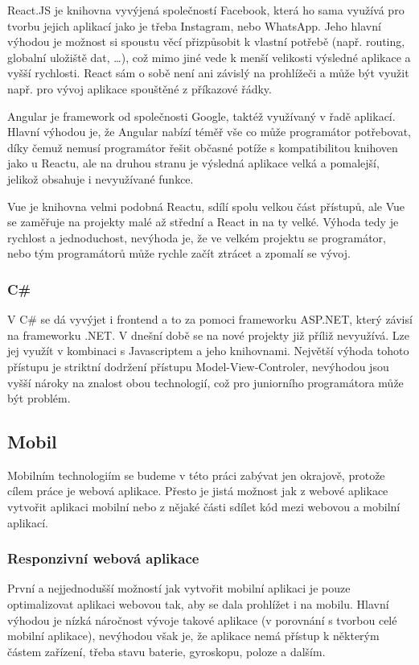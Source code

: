 React.JS je knihovna vyvýjená společností Facebook, která ho sama využívá pro tvorbu jejich aplikací jako je třeba Instagram, nebo WhatsApp. Jeho hlavní výhodou je možnost si spoustu věcí přizpůsobit k vlastní potřebě (např. routing, globalní uložiště dat, \ldots{}), což mimo jiné vede k menší velikosti výsledné aplikace a vyšší rychlosti. React sám o sobě není ani závislý na prohlížeči a může být využit např. pro vývoj aplikace spouštěné z příkazové řádky.

Angular je framework od společnosti Google, taktéž využívaný v řadě aplikací. Hlavní výhodou je, že Angular nabízí téměř vše co může programátor potřebovat, díky čemuž nemusí programátor řešit občasné potíže s kompatibilitou knihoven jako u Reactu, ale na druhou stranu je výsledná aplikace velká a pomalejší, jelikož obsahuje i nevyužívané funkce.

Vue je knihovna velmi podobná Reactu, sdílí spolu velkou část přístupů, ale Vue se zaměřuje na projekty malé až střední a React in na ty velké. Výhoda tedy je rychlost a jednoduchost, nevýhoda je, že ve velkém projektu se programátor, nebo tým programátorů může rychle začít ztrácet a zpomalí se vývoj.

\subsubsection{C\# }
V C\# se dá vyvýjet i frontend a to za pomoci frameworku ASP.NET, který závisí na frameworku .NET. V dnešní době se na nové projekty již příliž nevyužívá. Lze jej využít v kombinaci s Javascriptem a jeho knihovnami. Největší výhoda tohoto přístupu je striktní dodržení přístupu Model-View-Controler, nevýhodou jsou vyšší nároky na znalost obou technologií, což pro juniorního programátora může být problém.

\subsection{Mobil}
\label{ss:mobile}
Mobilním technologiím se budeme v této práci zabývat jen okrajově, protože cílem práce je webová aplikace. Přesto je jistá možnost jak z webové aplikace vytvořit aplikaci mobilní nebo z nějaké části sdílet kód mezi webovou a mobilní aplikací.

\subsubsection{Responzivní webová aplikace}
\label{sss:responsive_web_app}
První a nejjednodušší možností jak vytvořit mobilní aplikaci je pouze optimalizovat aplikaci webovou tak, aby se dala prohlížet i na mobilu. Hlavní výhodou je nízká náročnost vývoje takové aplikace (v porovnání s tvorbou celé mobilní aplikace), nevýhodou však je, že aplikace nemá přístup k některým částem zařízení, třeba stavu baterie, gyroskopu, poloze a dalším.

